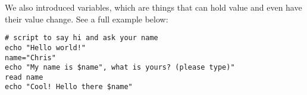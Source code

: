\documentclass{article}
\begin{document}
We also introduced variables, which are things that can hold value and even
have their value change. See a full example below:
\begin{lstlisting}
# script to say hi and ask your name
echo "Hello world!"
name="Chris"
echo "My name is $name", what is yours? (please type)"
read name
echo "Cool! Hello there $name"
\end{lstlisting}
\end{document}

